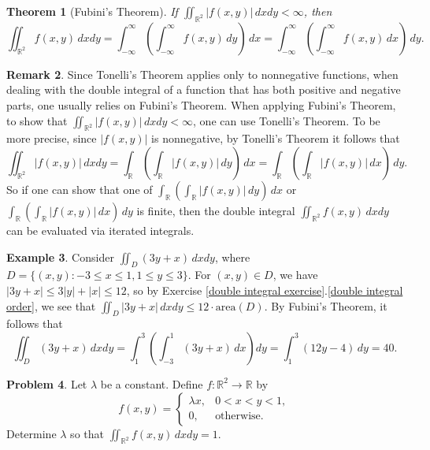 \documentclass[12pt,letterpaper]{book}
\numberwithin{equation}{section}
\newtheorem{thm}{\textbf{Theorem}}[section]
\theoremstyle{definition}
\newtheorem{problem}[thm]{\textbf{Problem}}
\newtheorem{example}[thm]{\textbf{Example}}
\newtheorem{remark}[thm]{\textbf{Remark}}
\begin{document}
\begin{thm}[Fubini's Theorem] If $\displaystyle{\iint_{\mathbb{R}^2} |f(x,y)|\,dxdy}<\infty$, then
$$\iint_{\mathbb{R}^2} f(x,y)\,dxdy=\int_{-\infty}^\infty \left(\int_{-\infty}^\infty f(x,y)\,dy\right)\,dx=\int_{-\infty}^\infty \left(\int_{-\infty}^\infty f(x,y)\,dx\right)\,dy.$$
\end{thm}

\begin{remark}
Since Tonelli's Theorem applies only to nonnegative functions, when dealing with the double integral of a function that has both positive and negative parts, one usually relies on Fubini's Theorem. When applying Fubini's Theorem, to show that $\displaystyle{\iint_{\mathbb{R}^2} |f(x,y)|\,dxdy}<\infty$, one can use Tonelli's Theorem. To be more precise, since $|f(x,y)|$ is nonnegative, by Tonelli's Theorem it follows that
$$\iint_{\mathbb{R}^2} |f(x,y)|\,dxdy=\int_{\mathbb{R}} \left(\int_{\mathbb{R}} |f(x,y)|\,dy\right)\,dx=\int_{\mathbb{R}} \left(\int_{\mathbb{R}} |f(x,y)|\,dx\right)\,dy.$$
So if one can show that one of $\displaystyle{\int_{\mathbb{R}} \left(\int_{\mathbb{R}} |f(x,y)|\,dy\right)\,dx}$ or $\displaystyle{\int_{\mathbb{R}} \left(\int_{\mathbb{R}} |f(x,y)|\,dx\right)\,dy}$ is finite, then the double integral $\displaystyle{\iint_{\mathbb{R}^2} f(x,y)\,dxdy}$ can be evaluated via iterated integrals.
\end{remark}

\begin{example}\label{rectangle double integral}
Consider $\displaystyle{\iint_D(3y+x)\,dxdy}$, where $D=\{(x,y): -3\leq x \leq 1, 1\leq y\leq 3\}$. For $(x,y)\in D$, we have $|3y+x|\leq 3|y|+|x|\leq 12$, so by Exercise \ref{double integral exercise}.\ref{double integral order}, we see that $\displaystyle{\iint_D|3y+x|\,dxdy\leq 12\cdot\text{area}(D)}$. By Fubini's Theorem, it follows that
$$\iint_D(3y+x)\,dxdy=\int_1^3\left(\int_{-3}^1 \left(3y+x\right)\,dx\right)dy =\int_1^3 (12y-4)\,dy=40.$$
\end{example}

\begin{problem}
Let $\lambda$ be a constant. Define $f:\mathbb{R}^2\to \mathbb{R}$ by
$$f(x,y)=\begin{cases} \lambda x, &0<x<y<1, \\ 0, &\text{otherwise}.\end{cases}$$
Determine $\lambda$ so that $\displaystyle{\iint_{\mathbb{R}^2} f(x,y)\,dxdy=1}$.
\end{problem}
\end{document}
